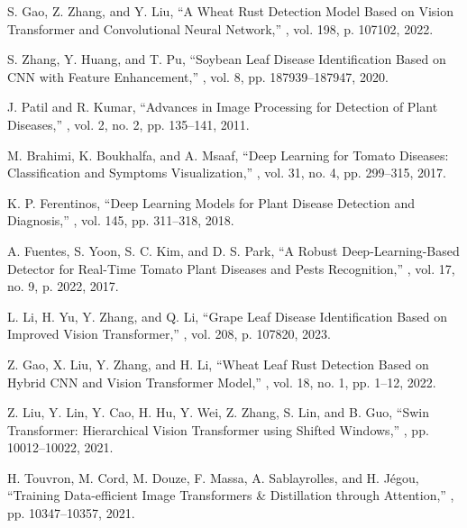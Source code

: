 \documentclass[preprint,12pt]{elsarticle}
\begin{document}
\begin{thebibliography}{99}
S. Gao, Z. Zhang, and Y. Liu,
\newblock ``A Wheat Rust Detection Model Based on Vision Transformer and Convolutional Neural Network,''
, vol. 198, p. 107102, 2022.

S. Zhang, Y. Huang, and T. Pu,
\newblock ``Soybean Leaf Disease Identification Based on CNN with Feature Enhancement,''
, vol. 8, pp. 187939–187947, 2020.

J. Patil and R. Kumar,
\newblock ``Advances in Image Processing for Detection of Plant Diseases,''
, vol. 2, no. 2, pp. 135--141, 2011.

M. Brahimi, K. Boukhalfa, and A. Msaaf,
\newblock ``Deep Learning for Tomato Diseases: Classification and Symptoms Visualization,''
, vol. 31, no. 4, pp. 299--315, 2017.

K. P. Ferentinos,
\newblock ``Deep Learning Models for Plant Disease Detection and Diagnosis,''
, vol. 145, pp. 311--318, 2018.

A. Fuentes, S. Yoon, S. C. Kim, and D. S. Park,
\newblock ``A Robust Deep-Learning-Based Detector for Real-Time Tomato Plant Diseases and Pests Recognition,''
, vol. 17, no. 9, p. 2022, 2017.

L. Li, H. Yu, Y. Zhang, and Q. Li,
\newblock ``Grape Leaf Disease Identification Based on Improved Vision Transformer,''
, vol. 208, p. 107820, 2023.

Z. Gao, X. Liu, Y. Zhang, and H. Li,
\newblock ``Wheat Leaf Rust Detection Based on Hybrid CNN and Vision Transformer Model,''
, vol. 18, no. 1, pp. 1--12, 2022.

Z. Liu, Y. Lin, Y. Cao, H. Hu, Y. Wei, Z. Zhang, S. Lin, and B. Guo,
\newblock ``Swin Transformer: Hierarchical Vision Transformer using Shifted Windows,''
, pp. 10012--10022, 2021.

H. Touvron, M. Cord, M. Douze, F. Massa, A. Sablayrolles, and H. Jégou,
\newblock ``Training Data-efficient Image Transformers \& Distillation through Attention,''
, pp. 10347--10357, 2021.


\end{thebibliography}
\end{document}
